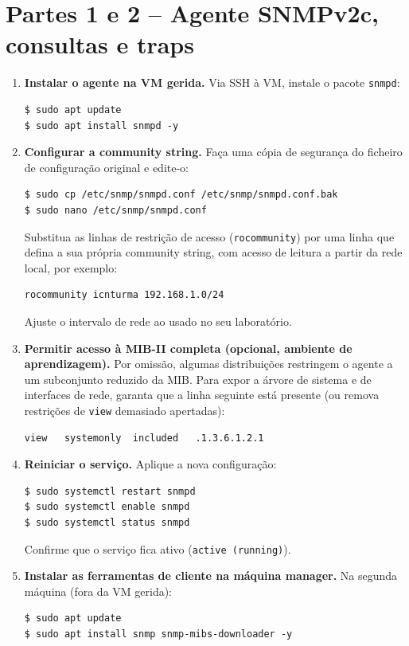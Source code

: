 \documentclass[11pt,a4paper]{article}
\begin{document}
\section{Partes 1 e 2 -- Agente SNMPv2c, consultas e traps}
\begin{enumerate}[label=\arabic*.]
  \item \textbf{Instalar o agente na VM gerida.} Via SSH à VM, instale o pacote \texttt{snmpd}:
\begin{lstlisting}
$ sudo apt update
$ sudo apt install snmpd -y
\end{lstlisting}

  \item \textbf{Configurar a community string.} Faça uma cópia de segurança do ficheiro de configuração original e edite-o:
\begin{lstlisting}
$ sudo cp /etc/snmp/snmpd.conf /etc/snmp/snmpd.conf.bak
$ sudo nano /etc/snmp/snmpd.conf
\end{lstlisting}
  Substitua as linhas de restrição de acesso (\texttt{rocommunity}) por uma linha que defina a sua própria community string, com acesso de leitura a partir da rede local, por exemplo:
\begin{lstlisting}
rocommunity icnturma 192.168.1.0/24
\end{lstlisting}
  Ajuste o intervalo de rede ao usado no seu laboratório.

  \item \textbf{Permitir acesso à MIB-II completa (opcional, ambiente de aprendizagem).} Por omissão, algumas distribuições restringem o agente a um subconjunto reduzido da MIB. Para expor a árvore de sistema e de interfaces de rede, garanta que a linha seguinte está presente (ou remova restrições de \texttt{view} demasiado apertadas):
\begin{lstlisting}
view   systemonly  included   .1.3.6.1.2.1
\end{lstlisting}

  \item \textbf{Reiniciar o serviço.} Aplique a nova configuração:
\begin{lstlisting}
$ sudo systemctl restart snmpd
$ sudo systemctl enable snmpd
$ sudo systemctl status snmpd
\end{lstlisting}
  Confirme que o serviço fica ativo (\texttt{active (running)}).

  \item \textbf{Instalar as ferramentas de cliente na máquina manager.} Na segunda máquina (fora da VM gerida):
\begin{lstlisting}
$ sudo apt update
$ sudo apt install snmp snmp-mibs-downloader -y
\end{lstlisting}


\end{enumerate}
\end{document}
